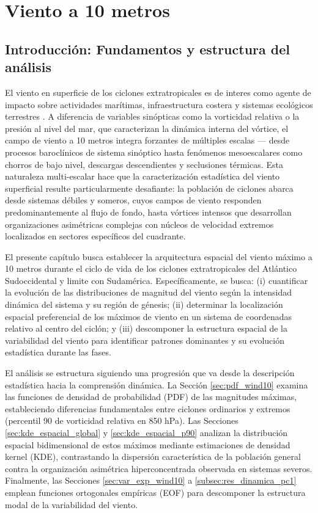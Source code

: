\chapter{Viento a 10 metros}\label{cap:resultados_wind10}
\section{Introducción: Fundamentos y estructura del análisis}\label{sec:intro_wind10}

El viento en superficie de los ciclones extratropicales es de interes como agente de impacto sobre actividades marítimas, infraestructura costera y sistemas ecológicos terrestres \citep{gramcianinov2023impact}. A diferencia de variables sinópticas como la vorticidad relativa o la presión al nivel del mar, que caracterizan la dinámica interna del vórtice, el campo de viento a 10 metros integra forzantes de múltiples escalas — desde procesos baroclínicos de sistema sinóptico hasta fenómenos mesoescalares como chorros de bajo nivel, descargas descendientes y seclusiones térmicas. Esta naturaleza multi-escalar hace que la caracterización estadística del viento superficial resulte particularmente desafiante: la población de ciclones abarca desde sistemas débiles y someros, cuyos campos de viento responden predominantemente al flujo de fondo, hasta vórtices intensos que desarrollan organizaciones asimétricas complejas con núcleos de velocidad extremos localizados en sectores específicos del cuadrante.

El presente capítulo busca establecer la arquitectura espacial del viento máximo a 10 metros durante el ciclo de vida de los ciclones extratropicales del Atlántico Sudoccidental y limite con Sudamérica. Específicamente, se busca: (i) cuantificar la evolución de las distribuciones de magnitud del viento según la intensidad dinámica del sistema y su región de génesis; (ii) determinar la localización espacial preferencial de los máximos de viento en un sistema de coordenadas relativo al centro del ciclón; y (iii) descomponer la estructura espacial de la variabilidad del viento para identificar patrones dominantes y su evolución estadística durante las fases.

El análisis se estructura siguiendo una progresión que va desde la descripción estadística hacia la comprensión dinámica. La Sección \ref{sec:pdf_wind10} examina las funciones de densidad de probabilidad (PDF) de las magnitudes máximas, estableciendo diferencias fundamentales entre ciclones ordinarios y extremos (percentil 90 de vorticidad relativa en 850 hPa). Las Secciones \ref{sec:kde_espacial_global} y \ref{sec:kde_espacial_p90} analizan la distribución espacial bidimensional de estos máximos mediante estimaciones de densidad kernel (KDE), contrastando la dispersión característica de la población general contra la organización asimétrica hiperconcentrada observada en sistemas severos. Finalmente, las Secciones \ref{sec:var_exp_wind10} a \ref{subsec:res_dinamica_pc1} emplean funciones ortogonales empíricas (EOF) para descomponer la estructura modal de la variabilidad del viento.

